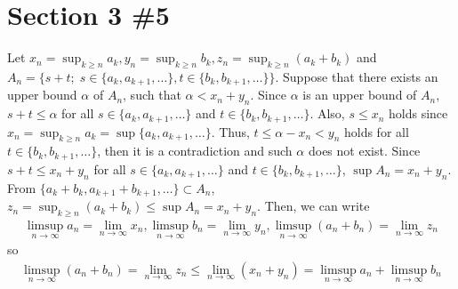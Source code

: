 \documentclass{scrartcl}
\begin{document}
\section{Section 3 \#5}
Let \(x_n = \sup_{k \geq n} a_k, y_n = \sup_{k \geq n} b_k, z_n = \sup_{k \geq n} (a_k + b_k)\) and \(A_n = \{s + t;\; s \in \{a_k, a_{k + 1}, \dots\}, t \in \{b_k, b_{k + 1}, \dots\}\}\).
Suppose that there exists an upper bound \(\alpha\) of \(A_n\), such that \(\alpha < x_n + y_n\).
Since \(\alpha\) is an upper bound of \(A_n\), \(s + t \leq \alpha\) for all \(s \in \{a_k, a_{k + 1}, \dots\}\) and \(t \in \{b_k, b_{k + 1}, \dots\}\).
Also, \(s \leq x_n\) holds since \(x_n = \sup_{k \geq n} a_k = \sup \{a_k, a_{k + 1}, \dots\}\).
Thus, \(t \leq \alpha - x_n < y_n\) holds for all \(t \in \{b_k, b_{k + 1}, \dots\}\), then it is a contradiction and such \(\alpha\) does not exist.
Since \(s + t \leq x_n + y_n\) for all \(s \in \{a_k, a_{k + 1}, \dots\}\) and \(t \in \{b_k, b_{k + 1}, \dots\}\), \(\sup A_n = x_n + y_n\).
From \(\{a_k + b_k, a_{k + 1} + b_{k + 1}, \dots\} \subset A_n\), \(z_n = \sup_{k \geq n} (a_k + b_k) \leq \sup A_n = x_n + y_n\).
Then, we can write
\begin{align*}
  \limsup_{n \to \infty} a_n = \lim_{n \to \infty} x_n, \limsup_{n \to \infty} b_n = \lim_{n \to \infty} y_n, \limsup_{n \to \infty} (a_n + b_n) = \lim_{n \to \infty} z_n
\end{align*}
so
\begin{align*}
  \limsup_{n \to \infty} (a_n + b_n) = \lim_{n \to \infty} z_n \leq \lim_{n \to \infty} (x_n + y_n) = \limsup_{n \to \infty} a_n + \limsup_{n \to \infty} b_n
\end{align*}
\end{document}
